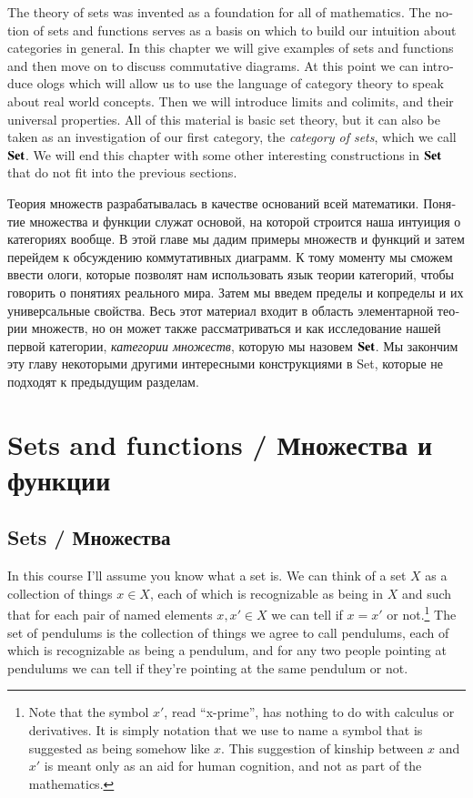 \documentclass[a4paper]{book}
\def\Set{{\bf Set}}
\theoremstyle{myth}
\begin{document}
\begin{english}
The theory of sets was invented as a foundation for all of mathematics. The notion of sets and functions serves as a basis on which to build our intuition about categories in general. In this chapter we will give examples of sets and functions and then move on to discuss commutative diagrams. At this point we can introduce ologs which will allow us to use the language of category theory to speak about real world concepts. Then we will introduce limits and colimits, and their universal properties. All of this material is basic set theory, but it can also be taken as an investigation of our first category, the {\em category of sets}, which we call $\Set$. We will end this chapter with some other interesting constructions in $\Set$ that do not fit into the previous sections.

\begin{russian}Теория множеств разрабатывалась в качестве оснований всей математики. Понятие множества и функции служат основой, на которой строится наша интуиция о категориях вообще. В этой главе мы дадим примеры множеств и функций и затем перейдем к обсуждению коммутативных диаграмм. К тому моменту мы сможем ввести ологи, которые позволят нам использовать язык теории категорий, чтобы говорить о понятиях реального мира. Затем мы введем пределы и копределы и их универсальные свойства. Весь этот материал входит в область элементарной теории множеств, но он может также рассматриваться и как исследование нашей первой категории, {\em категории множеств}, которую мы назовем $\Set$. Мы закончим эту главу некоторыми другими интересными конструкциями в Set, которые не подходят к предыдущим разделам.\end{russian}


\section{Sets and functions / Множества и функции} 


\subsection{Sets / Множества}

In this course I'll assume you know what a set is. We can think of a set $X$ as a collection of things $x\in X$, each of which is recognizable as being in $X$ and such that for each pair of named elements $x,x'\in X$ we can tell if $x=x'$ or not.\footnote{Note that the symbol $x'$, read “x-prime”, has nothing to do with calculus or derivatives. It is simply notation that we use to name a symbol that is suggested as being somehow like $x$. This suggestion of kinship between $x$ and $x'$ is meant only as an aid for human cognition, and not as part of the mathematics.}
The set of pendulums is the collection of things we agree to call pendulums, each of which is recognizable as being a pendulum, and for any two people pointing at pendulums we can tell if they're pointing at the same pendulum or not. 


\end{english}
\end{document}
